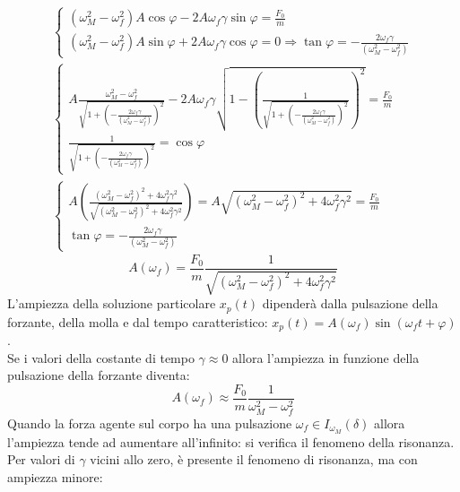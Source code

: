 \documentclass{article}
\numberwithin{equation}{subsection}
\begin{document}
\begin{gather*}
    \begin{cases}
        (\omega_M^{2}-\omega_f^{2})A\cos\varphi-2A\omega_f\gamma \sin\varphi=\displaystyle\frac{F_0}{m}\\
        (\omega_M^{2}-\omega_f^{2})A\sin\varphi+2A\omega_f\gamma \cos\varphi=0\Rightarrow\displaystyle \tan\varphi=-\frac{2\omega_f\gamma}{(\omega_M^{2}-\omega_f^{2})}
    \end{cases}\\
    \begin{cases}
        \displaystyle A\frac{\omega_M^{2}-\omega_f^{2}}{\sqrt{1+\left(-\frac{2\omega_f\gamma}{(\omega_M^{2}-\omega_f^{2})}\right)^{2}}}-2A\omega_f\gamma\sqrt{1-\left(\displaystyle\frac{1}{\sqrt{1+\left(-\frac{2\omega_f\gamma}{(\omega_M^{2}-\omega_f^{2})}\right)^{2}}}\right)^{2}}=\frac{F_0}{m}\\
        \displaystyle\frac{1}{\sqrt{1+\left(-\frac{2\omega_f\gamma}{(\omega_M^{2}-\omega_f^{2})}\right)^{2}}}=\cos\varphi
    \end{cases}\\
    \begin{cases}
        A\left(\displaystyle\frac{(\omega_M^{2}-\omega_f^{2})^{2}+4\omega_f^{2}\gamma^{2}}{\sqrt{(\omega_M^{2}-\omega_f^{2})^{2}+4\omega_f^{2}\gamma^{2}}}\right)=A\sqrt{(\omega_M^{2}-\omega_f^{2})^{2}+4\omega_f^{2}\gamma^{2}}=\displaystyle\frac{F_0}{m} \\
        \tan\varphi=-\displaystyle\frac{2\omega_f\gamma}{(\omega_M^{2}-\omega_f^{2})}
    \end{cases}
\end{gather*}
\begin{equation}
    A(\omega_f)=\frac{F_0}{m}\frac{1}{\sqrt{(\omega_M^{2}-\omega_f^{2})^{2}+4\omega_f^{2}\gamma^{2}}}
\end{equation}
L'ampiezza della soluzione particolare $x_p(t)$ dipenderà 
dalla pulsazione della forzante, della molla e dal tempo 
caratteristico: $x_p(t)=A(\omega_f)\sin(\omega_f t+\varphi)$. 
\\
Se i valori della costante di tempo $\gamma\approx0$ allora 
l'ampiezza in funzione della pulsazione della forzante diventa:
\begin{equation}
    A(\omega_f)\approx\displaystyle\frac{F_0}{m}\frac{1}{\omega_M^{2}-\omega_f^{2}}
\end{equation}
Quando la forza agente sul corpo ha una pulsazione 
$\omega_f\in I_{\omega_M}(\delta)$ allora l'ampiezza tende 
ad aumentare all'infinito: si verifica il fenomeno della 
risonanza. Per valori di $\gamma$ vicini allo zero, è presente 
il fenomeno di risonanza, ma con ampiezza minore:
\end{document}
